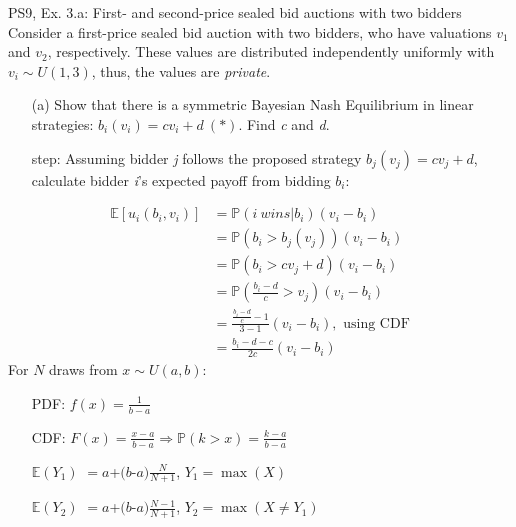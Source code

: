 \begin{frame}{PS9, Ex. 3.a: First- and second-price sealed bid auctions with two bidders}
    Consider a first-price sealed bid auction with two bidders, who have valuations $v_1$ and $v_2$, respectively. These values are distributed independently uniformly with $v_i\sim U(1,3)$, thus, the values are \textit{private}.
    \vspace{-4pt}
    \begin{itemize}
      \item[(a)] Show that there is a symmetric Bayesian Nash Equilibrium in linear strategies: $b_i(v_i) = cv_i + d\ (*)$. Find \textit{c} and \textit{d}.
    \end{itemize}
    \vspace{-8pt}
    \begin{multicols}{2}
      \begin{itemize}
        \item[\nth{1} step:] Assuming bidder \textit{j} follows the proposed strategy $b_j(v_j) = cv_j + d$, calculate bidder \textit{i}'s expected payoff from bidding $b_i$:
      \end{itemize}
      \vspace{-4pt}
      \begin{align*}
        \mathbb{E}[u_i(b_i,v_i)]&=\mathbb{P}(i\ wins|b_i)(v_i-b_i)\\
                                &=\mathbb{P}(b_i>b_j(v_j))(v_i-b_i)\\
                                &=\mathbb{P}(b_i>cv_j+d)(v_i-b_i)\\
                                &=\mathbb{P}\left(\frac{b_i-d}{c}>v_j\right)(v_i-b_i)\\
                                &=\frac{\frac{b_i-d}{c}-1}{3-1}(v_i-b_i),\text{ using CDF}\\
                                &=\frac{b_i-d-c}{2c}(v_i-b_i)
      \end{align*}
      \vfill\null\columnbreak
      For $N$ draws from $x\sim U(a, b):$
      \vspace{-6pt}
      \begin{enumerate}
        \item[PDF:] $f(x)=\frac{1}{b-a}$
        \item[CDF:] $F(x)=\frac{x-a}{b-a}\Rightarrow\mathbb{P}(k>x)=\frac{k-a}{b-a}$
        \item[$\mathbb{E}(Y_1)$] $=a$+$(b$-$a)\frac{N}{N+1}$, $Y_1=\max(X)$
        \item[$\mathbb{E}(Y_2)$] $=a$+$(b$-$a)\frac{N-1}{N+1}$, $Y_2=\max(X\neq Y_1)$
      \end{enumerate}
      \vfill\null
    \end{multicols}
\end{frame}
